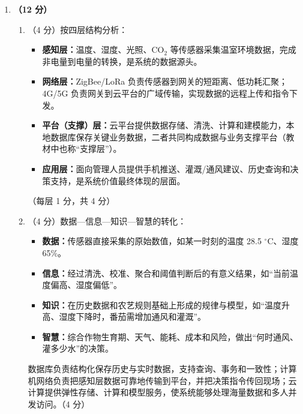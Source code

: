 \documentclass[a4paper,11pt]{article}
\begin{document}
\begin{enumerate}[start=29, label=\textbf{\arabic*.}, leftmargin=2.4em, itemsep=0.55em]
\item \textbf{（12 分）}
\begin{enumerate}[label=（\arabic*）, leftmargin=2.2em, itemsep=2pt]
  \item （4 分）按四层结构分析：
  \begin{itemize}[leftmargin=1.8em, itemsep=1pt]
    \item \textbf{感知层：}温度、湿度、光照、CO$_2$ 等传感器采集温室环境数据，完成非电量到电量的转换，是系统的数据源头。
    \item \textbf{网络层：}ZigBee/LoRa 负责传感器到网关的短距离、低功耗汇聚；4G/5G 负责网关到云平台的广域传输，实现数据的远程上传和指令下发。
    \item \textbf{平台（支撑）层：}云平台提供数据存储、清洗、计算和建模能力，本地数据库保存关键业务数据，二者共同构成数据与业务支撑平台（教材中也称“支撑层”）。
    \item \textbf{应用层：}面向管理人员提供手机推送、灌溉/通风建议、历史查询和决策支持，是系统价值最终体现的层面。
  \end{itemize}
  \hfill（每层 1 分，共 4 分）

  \item （4 分）数据—信息—知识—智慧的转化：
  \begin{itemize}[leftmargin=1.8em, itemsep=1pt]
    \item \textbf{数据：}传感器直接采集的原始数值，如某一时刻的温度 28.5 $^\circ$C、湿度 65\%。
    \item \textbf{信息：}经过清洗、校准、聚合和阈值判断后的有意义结果，如“当前温度偏高、湿度偏低”。
    \item \textbf{知识：}在历史数据和农艺规则基础上形成的规律与模型，如“温度升高、湿度下降时，番茄需增加通风和灌溉”。
    \item \textbf{智慧：}综合作物生育期、天气、能耗、成本和风险，做出“何时通风、灌多少水”的决策。
  \end{itemize}
  数据库负责结构化保存历史与实时数据，支持查询、事务和一致性；计算机网络负责把感知层数据可靠地传输到平台，并把决策指令传回现场；云计算提供弹性存储、计算和模型服务，使系统能够处理海量数据和多人并发访问。\hfill（4 分）


\end{enumerate}
\end{enumerate}
\end{document}
